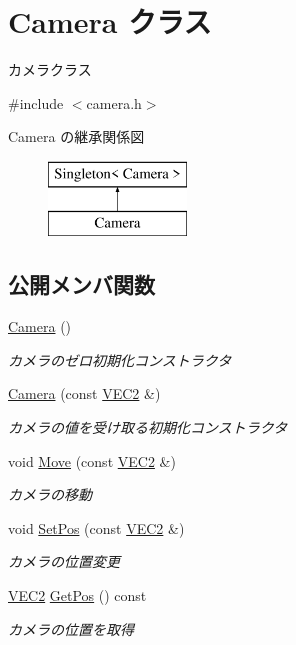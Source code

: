 \hypertarget{class_camera}{}\section{Camera クラス}
\label{class_camera}


カメラクラス  




{\ttfamily \#include $<$camera.\+h$>$}

Camera の継承関係図\begin{figure}[H]
\begin{center}
\leavevmode
\includegraphics[height=2.000000cm]{class_camera}
\end{center}
\end{figure}
\subsection*{公開メンバ関数}
\begin{DoxyCompactItemize}
\item 
\mbox{\hyperlink{class_camera_a01f94c3543f56ede7af49dc778f19331}{Camera}} ()
\begin{DoxyCompactList}\small\item\em カメラのゼロ初期化コンストラクタ \end{DoxyCompactList}\item 
\mbox{\hyperlink{class_camera_afe282ee51f1f39c041b0e7de9386cc6d}{Camera}} (const \mbox{\hyperlink{transform_8h_afb0c5e21d4133ff4f200992c0b534e1b}{V\+E\+C2}} \&)
\begin{DoxyCompactList}\small\item\em カメラの値を受け取る初期化コンストラクタ \end{DoxyCompactList}\item 
void \mbox{\hyperlink{class_camera_a5c6b7ad424d835a3022393099886a90b}{Move}} (const \mbox{\hyperlink{transform_8h_afb0c5e21d4133ff4f200992c0b534e1b}{V\+E\+C2}} \&)
\begin{DoxyCompactList}\small\item\em カメラの移動 \end{DoxyCompactList}\item 
void \mbox{\hyperlink{class_camera_af79aa3fedd030712e7fa122a2ea88b48}{Set\+Pos}} (const \mbox{\hyperlink{transform_8h_afb0c5e21d4133ff4f200992c0b534e1b}{V\+E\+C2}} \&)
\begin{DoxyCompactList}\small\item\em カメラの位置変更 \end{DoxyCompactList}\item 
\mbox{\hyperlink{transform_8h_afb0c5e21d4133ff4f200992c0b534e1b}{V\+E\+C2}} \mbox{\hyperlink{class_camera_ac3b4f1248489c0ac0faa521329de71cd}{Get\+Pos}} () const
\begin{DoxyCompactList}\small\item\em カメラの位置を取得 \end{DoxyCompactList}\end{DoxyCompactItemize}
